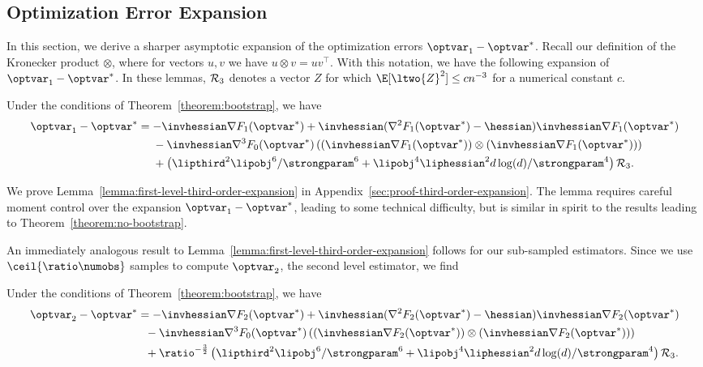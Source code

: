 \documentclass[11pt,twoside]{article}
\theoremstyle{definition}
\begin{document}
\subsection{Optimization Error Expansion}

In this section, we derive a sharper asymptotic expansion of the optimization
errors $\optvar_1 - \optvar^*$.
Recall our definition of the Kronecker product $\otimes$, where for vectors
$u, v$ we have $u \otimes v = u v^\top$. With this notation, we have the
following expansion of $\optvar_1 - \optvar^*$.
In these lemmas, $\mathcal{R}_3$
denotes a vector $Z$ for which $\E[\ltwo{Z}^2] \le c n^{-3}$ for a numerical
constant $c$.
\begin{lemma}
  \label{lemma:first-level-third-order-expansion}
  Under the conditions of Theorem~\ref{theorem:bootstrap}, we have
  \begin{align}
    \optvar_1 - \optvar^* & = -\invhessian \nabla F_1(\optvar^*)
    + \invhessian(\nabla^2 F_1(\optvar^*) - \hessian)
    \invhessian \nabla F_1(\optvar^*)
    \label{eqn:third-order-expansion} \\
    & \quad ~ - \invhessian \nabla^3 F_0(\optvar^*)\left(
    (\invhessian \nabla F_1(\optvar^*)) \otimes
    (\invhessian \nabla F_1(\optvar^*)) \right)\nonumber \\
    & \quad ~ + \left(\lipthird^2 \lipobj^6 / \strongparam^6
    + \lipobj^4 \liphessian^2 d \log(d) / \strongparam^4\right)
    \remainder_3.
    \nonumber
  \end{align}
\end{lemma}
\noindent
We prove Lemma~\ref{lemma:first-level-third-order-expansion} in
Appendix~\ref{sec:proof-third-order-expansion}.  The lemma requires
careful moment control over the expansion $\optvar_1 - \optvar^*$, leading
to some technical difficulty, but is similar in spirit to the results leading
to Theorem~\ref{theorem:no-bootstrap}.

An immediately analogous result to
Lemma~\ref{lemma:first-level-third-order-expansion}
follows for our sub-sampled estimators. Since we use
$\ceil{\ratio \numobs}$ samples to compute $\optvar_2$, the second
level estimator, we find
\begin{lemma}
  \label{lemma:second-level-third-order-expansion}
  Under the conditions of Theorem~\ref{theorem:bootstrap},
  we have
  \begin{align*}
    \optvar_2 - \optvar^* & = -\invhessian \nabla F_2(\optvar^*)
    + \invhessian(\nabla^2 F_2(\optvar^*) - \hessian)
    \invhessian \nabla F_2(\optvar^*) \\
    & ~~ - \invhessian \nabla^3 F_0(\optvar^*)\left(
    (\invhessian \nabla F_2(\optvar^*)) \otimes
    (\invhessian \nabla F_2(\optvar^*)) \right)\\
    & ~~ + \ratio^{-\frac{3}{2}} \left(\lipthird^2 \lipobj^6 / \strongparam^6
    + \lipobj^4 \liphessian^2 d \log(d) / \strongparam^4\right)
    \remainder_3.
  \end{align*}
\end{lemma}
\end{document}

